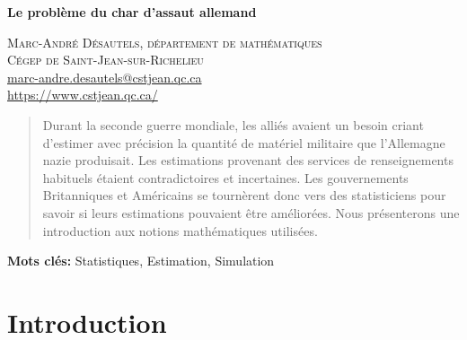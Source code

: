 \documentclass[10pt]{article}
\begin{document}


\renewcommand{\tablename}{\textsc{Tableau}}

\begin{center}
\textsf{\LARGE \textbf{Le problème du char d'assaut allemand}}
\end{center}

\begin{flushright}
\textsc{Marc-André Désautels, département de mathématiques} \\
\textsc{Cégep de Saint-Jean-sur-Richelieu} \\
\href{mailto:marc-andre.desautels@cstjean.qc.ca}{marc-andre.desautels@cstjean.qc.ca} \\
\href{https://www.cstjean.qc.ca/}{https://www.cstjean.qc.ca/}
\end{flushright}


\baselineskip


\begin{abstract}

Durant la seconde guerre mondiale, les alliés avaient un besoin criant
d'estimer avec précision la quantité de matériel militaire que
l'Allemagne nazie produisait. Les estimations provenant des services de
renseignements habituels étaient contradictoires et incertaines. Les
gouvernements Britanniques et Américains se tournèrent donc vers des
statisticiens pour savoir si leurs estimations pouvaient être
améliorées. Nous présenterons une introduction aux notions mathématiques
utilisées.

\end{abstract}

\textbf{Mots clés: } Statistiques, Estimation, Simulation

\bigskip

\hypertarget{introduction}{%
\section{\texorpdfstring{Introduction
\label{intro}}{Introduction }}\label{introduction}}
\end{document}

